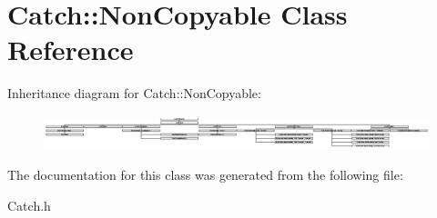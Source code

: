 \hypertarget{class_catch_1_1_non_copyable}{\section{Catch\-:\-:Non\-Copyable Class Reference}
\label{class_catch_1_1_non_copyable}
}
Inheritance diagram for Catch\-:\-:Non\-Copyable\-:\begin{figure}[H]
\begin{center}
\leavevmode
\includegraphics[height=1.002237cm]{class_catch_1_1_non_copyable}
\end{center}
\end{figure}


The documentation for this class was generated from the following file\-:\begin{DoxyCompactItemize}
\item 
Catch.\-h\end{DoxyCompactItemize}
